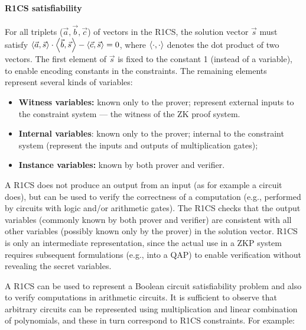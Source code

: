 \paragraph{R1CS satisfiability}
For all triplets ($\vec{a}, \vec{b}, \vec{c}$) of vectors in the R1CS, the solution vector $\vec{s}$ must satisfy $\left\langle \vec{a}, \vec{s}\right\rangle \cdot \left\langle \vec{b}, \vec{s}\right\rangle - \left\langle \vec{c}, \vec{s}\right\rangle = 0$, where $\left\langle \cdot, \cdot\right\rangle$ denotes the dot product of two vectors.
The first element of $\vec{s}$ is fixed to the constant 1 (instead of a variable), to enable encoding constants in the constraints.
The remaining elements represent several kinds of variables:

\begin{itemize}
\item \textbf{Witness variables:} 
known only to the prover; represent external inputs to the constraint system --- the witness of the ZK proof system.

\item \textbf{Internal variables}: 
known only to the prover; internal to the constraint system (represent the inputs and outputs of multiplication gates);

\item \textbf{Instance variables:} 
known by both prover and verifier.
\end{itemize}

A R1CS does not produce an output from an input (as for example a circuit does), but can be used to verify the correctness of a computation (e.g., performed by circuits with logic and/or arithmetic gates).
The R1CS checks that the output variables (commonly known by both prover and verifier) are consistent with all other variables (possibly known only by the prover) in the solution vector.
R1CS is only an intermediate representation, since the actual use in a ZKP system requires subsequent formulations (e.g., into a QAP) to enable verification without revealing the secret variables.

A R1CS can be used to represent a Boolean circuit satisfiability problem and also to verify computations in arithmetic circuits.
It is sufficient to observe that arbitrary circuits can be represented using multiplication and linear combination of polynomials, and these in turn correspond to R1CS constraints.
For example:



